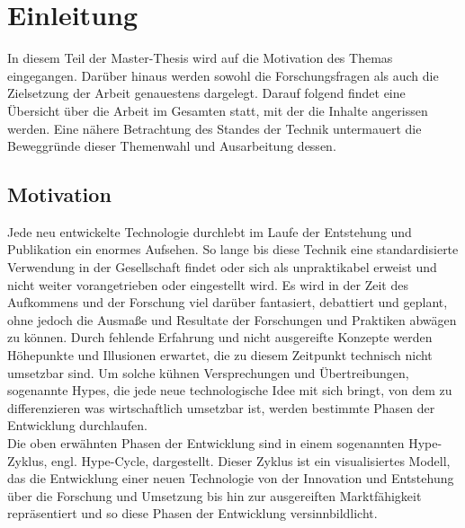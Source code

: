 \chapter{Einleitung}
\label{chap:Einleitung}
    In diesem Teil der Master-Thesis wird auf die Motivation des Themas eingegangen. Darüber hinaus 
    werden sowohl die Forschungsfragen als auch die Zielsetzung der Arbeit genauestens dargelegt. Darauf 
    folgend findet eine Übersicht über die Arbeit im Gesamten statt, mit der die Inhalte angerissen werden. 
    Eine nähere Betrachtung des Standes der Technik untermauert die Beweggründe dieser Themenwahl und 
    Ausarbeitung dessen. 

\section{Motivation}
\label{sec:Motivation}
    Jede neu entwickelte Technologie durchlebt im Laufe der Entstehung und Publikation ein enormes Aufsehen. 
    So lange bis diese Technik eine standardisierte Verwendung in der Gesellschaft findet oder sich als 
    unpraktikabel erweist und nicht weiter vorangetrieben oder eingestellt wird. Es wird in der Zeit des 
    Aufkommens und der Forschung viel darüber fantasiert, debattiert und geplant, ohne jedoch die Ausmaße und 
    Resultate der Forschungen und Praktiken abwägen zu können. Durch fehlende Erfahrung und nicht ausgereifte 
    Konzepte werden Höhepunkte und Illusionen erwartet, die zu diesem Zeitpunkt technisch nicht umsetzbar sind. 
    Um solche kühnen Versprechungen und Übertreibungen, sogenannte Hypes, die jede neue technologische Idee 
    mit sich bringt, von dem zu differenzieren was wirtschaftlich umsetzbar ist, werden bestimmte Phasen 
    der Entwicklung durchlaufen. \cite{gartner.2022m}
    \\
    \linebreak
    Die oben erwähnten Phasen der Entwicklung sind in einem sogenannten Hype-Zyklus, engl. Hype-Cycle, dargestellt. 
    Dieser Zyklus ist ein visualisiertes Modell, das die Entwicklung einer neuen Technologie von der Innovation 
    und Entstehung über die Forschung und Umsetzung bis hin zur ausgereiften Marktfähigkeit repräsentiert und so 
    diese Phasen der Entwicklung versinnbildlicht.  

